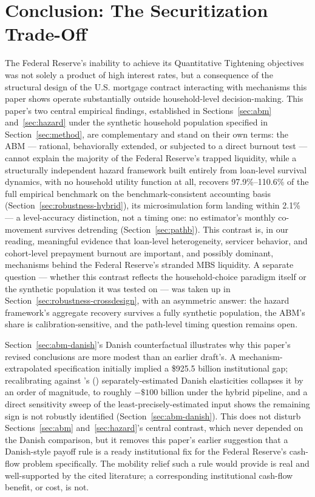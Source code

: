 \documentclass[12pt]{article}
\newcommand{\citepos}[1]{\citeauthor{#1}'s (\citeyear{#1})}
\begin{document}
\section{Conclusion: The Securitization Trade-Off}\label{sec:conclusion}

The Federal Reserve's inability to achieve its Quantitative Tightening objectives was not solely a product of high interest rates, but a consequence of the structural design of the U.S. mortgage contract interacting with mechanisms this paper shows operate substantially outside household-level decision-making. This paper's two central empirical findings, established in Sections~\ref{sec:abm} and~\ref{sec:hazard} under the synthetic household population specified in Section~\ref{sec:method}, are complementary and stand on their own terms: the ABM --- rational, behaviorally extended, or subjected to a direct burnout test --- cannot explain the majority of the Federal Reserve's trapped liquidity, while a structurally independent hazard framework built entirely from loan-level survival dynamics, with no household utility function at all, recovers 97.9\%--110.6\% of the full empirical benchmark on the benchmark-consistent accounting basis (Section~\ref{sec:robustness-hybrid}), its microsimulation form landing within 2.1\% --- a level-accuracy distinction, not a timing one: no estimator's monthly co-movement survives detrending (Section~\ref{sec:pathb}). This contrast is, in our reading, meaningful evidence that loan-level heterogeneity, servicer behavior, and cohort-level prepayment burnout are important, and possibly dominant, mechanisms behind the Federal Reserve's stranded MBS liquidity. A separate question --- whether this contrast reflects the household-choice paradigm itself or the synthetic population it was tested on --- was taken up in Section~\ref{sec:robustness-crossdesign}, with an asymmetric answer: the hazard framework's aggregate recovery survives a fully synthetic population, the ABM's share is calibration-sensitive, and the path-level timing question remains open.

Section~\ref{sec:abm-danish}'s Danish counterfactual illustrates why this paper's revised conclusions are more modest than an earlier draft's. A mechanism-extrapolated specification initially implied a \$925.5 billion institutional gap; recalibrating against \citepos{berger2026} separately-estimated Danish elasticities collapses it by an order of magnitude, to roughly $-\$100$ billion under the hybrid pipeline, and a direct sensitivity sweep of the least-precisely-estimated input shows the remaining sign is not robustly identified (Section~\ref{sec:abm-danish}). This does not disturb Sections~\ref{sec:abm} and~\ref{sec:hazard}'s central contrast, which never depended on the Danish comparison, but it removes this paper's earlier suggestion that a Danish-style payoff rule is a ready institutional fix for the Federal Reserve's cash-flow problem specifically. The mobility relief such a rule would provide is real and well-supported by the cited literature; a corresponding institutional cash-flow benefit, or cost, is not.
\end{document}
